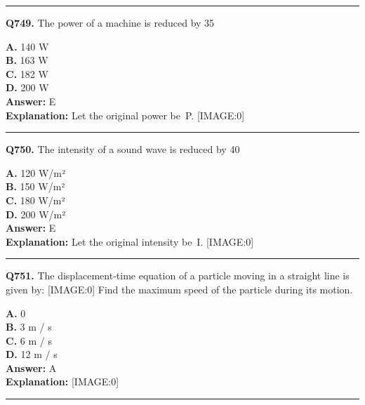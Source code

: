 \documentclass[12pt]{article}
\begin{document}
\hrule
\vspace{1em}


\noindent
\textbf{Q749.} The power of a machine is reduced by 35%



\textbf{A.} 140 W \\
\textbf{B.} 163 W \\
\textbf{C.} 182 W \\
\textbf{D.} 200 W \\

\textbf{Answer:} E \\
\textbf{Explanation:} Let the original power be P.
[IMAGE:0]

\hrule
\vspace{1em}


\noindent
\textbf{Q750.} The intensity of a sound wave is reduced by 40%



\textbf{A.} 120 W/m² \\
\textbf{B.} 150 W/m² \\
\textbf{C.} 180 W/m² \\
\textbf{D.} 200 W/m² \\

\textbf{Answer:} E \\
\textbf{Explanation:} Let the original intensity be I.
[IMAGE:0]

\hrule
\vspace{1em}


\noindent
\textbf{Q751.} The displacement-time equation of a particle moving in a straight line is given by:
[IMAGE:0]
Find the maximum speed of the particle during its motion.



\textbf{A.} 0 \\
\textbf{B.} 3
m
/
s \\
\textbf{C.} 6
m
/
s \\
\textbf{D.} 12
m
/
s \\

\textbf{Answer:} A \\
\textbf{Explanation:} [IMAGE:0]

\hrule
\vspace{1em}
\end{document}
